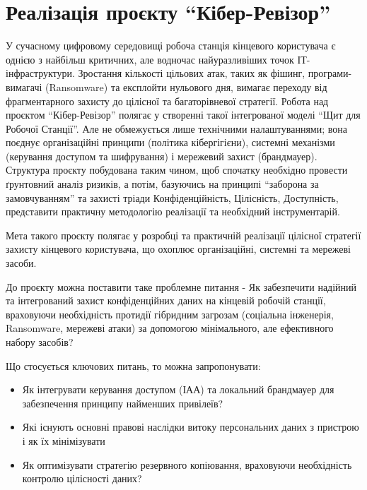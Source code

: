 


\section {\centering Реалізація проєкту ``Кібер-Ревізор''}

У сучасному цифровому середовищі робоча станція кінцевого користувача є однією з найбільш критичних, але водночас найуразливіших точок ІТ-інфраструктури. Зростання кількості цільових атак, таких як фішинг, програми-вимагачі (Ransomware) та експлойти нульового дня, вимагає переходу від фрагментарного захисту до цілісної та багаторівневої стратегії. Робота над проєктом ``Кібер-Ревізор'' полягає у створенні такої інтегрованої моделі ``Щит для Робочої Станції''. Але не обмежується лише технічними налаштуваннями; вона поєднує організаційні принципи (політика кібергігієни), системні механізми (керування доступом та шифрування) і мережевий захист (брандмауер). Структура проєкту побудована таким чином, щоб спочатку необхідно провести ґрунтовний аналіз ризиків, а потім, базуючись на принципі ``заборона за замовчуванням'' та захисті  тріади Конфіденційність, Цілісність, Доступність, представити практичну методологію реалізації та необхідний інструментарій.

Мета такого проєкту полягає у розробці та практичній реалізації цілісної стратегії захисту кінцевого користувача, що охоплює організаційні, системні та мережеві засоби.

До проєкту можна поставити таке проблемне питання - Як забезпечити надійний та інтегрований захист конфіденційних даних на кінцевій робочій станції, враховуючи необхідність протидії гібридним загрозам (соціальна інженерія, Ransomware, мережеві атаки) за допомогою мінімального, але ефективного набору засобів?

Що стосується ключових питань, то можна запропонувати:
\begin{itemize}
    \item Як інтегрувати керування доступом (ІАА) та локальний брандмауер для забезпечення принципу найменших привілеїв?
    \item Які існують основні правові наслідки витоку персональних даних з пристрою і як їх мінімізувати
    \item Як оптимізувати стратегію резервного копіювання, враховуючи необхідність контролю цілісності даних?
\end{itemize}

